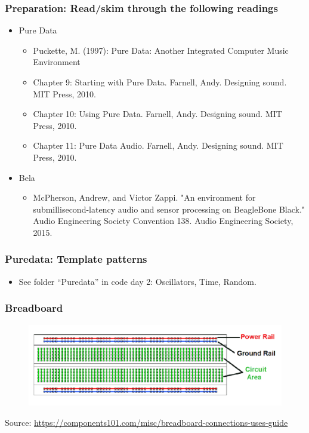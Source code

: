 \documentclass[screen, aspectratio=169]{beamer}
\begin{document}
\begin{frame}
  \frametitle{Preparation: Read/skim through the following readings}
  \begin{itemize}
  \item Pure Data
    \begin{itemize}
    \item Puckette, M. (1997): Pure Data: Another Integrated Computer Music Environment
    \item Chapter 9: Starting with Pure Data. Farnell, Andy. Designing sound. MIT Press, 2010.
    \item Chapter 10: Using Pure Data. Farnell, Andy. Designing sound. MIT Press, 2010.
    \item Chapter 11: Pure Data Audio. Farnell, Andy. Designing sound. MIT Press, 2010.
     \end{itemize}
     \item Bela
     \begin{itemize}
     \item McPherson, Andrew, and Victor Zappi. "An environment for submillisecond-latency audio and sensor processing on BeagleBone Black." Audio Engineering Society Convention 138. Audio Engineering Society, 2015.
     \end{itemize}
  \end{itemize}
\end{frame}
%
\begin{frame}
  \frametitle{Puredata: Template patterns }
       \begin{itemize}
     \item See folder ``Puredata'' in code day 2: Oscillators, Time, Random.
     \end{itemize}
\end{frame}
%
\begin{frame}
  \frametitle{Breadboard}
       \begin{figure}
	\includegraphics[scale=0.5]{img/breadboard-pinout.png}
	\end{figure}
{\tiny
Source: \url{https://components101.com/misc/breadboard-connections-uses-guide}
}
\end{frame}
\end{document}
